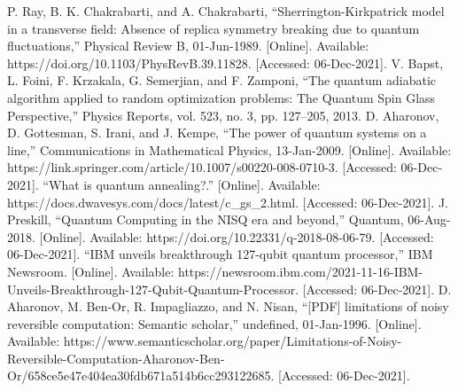\documentclass[conference]{IEEEtran}
\begin{document}
\begin{thebibliography}{00}
 P. Ray, B. K. Chakrabarti, and A. Chakrabarti, “Sherrington-Kirkpatrick model in a transverse field: Absence of replica symmetry breaking due to quantum fluctuations,” Physical Review B, 01-Jun-1989. [Online]. Available: https://doi.org/10.1103/PhysRevB.39.11828. [Accessed: 06-Dec-2021]. 
 V. Bapst, L. Foini, F. Krzakala, G. Semerjian, and F. Zamponi, “The quantum adiabatic algorithm applied to random optimization problems: The Quantum Spin Glass Perspective,” Physics Reports, vol. 523, no. 3, pp. 127–205, 2013.
 D. Aharonov, D. Gottesman, S. Irani, and J. Kempe, “The power of quantum systems on a line,” Communications in Mathematical Physics, 13-Jan-2009. [Online]. Available: https://link.springer.com/article/10.1007/s00220-008-0710-3. [Accessed: 06-Dec-2021]. 
 “What is quantum annealing?.” [Online]. Available: https://docs.dwavesys.com/docs/latest/c\_gs\_2.html. [Accessed: 06-Dec-2021]. 
 J. Preskill, “Quantum Computing in the NISQ era and beyond,” Quantum, 06-Aug-2018. [Online]. Available: https://doi.org/10.22331/q-2018-08-06-79. [Accessed: 06-Dec-2021].
 “IBM unveils breakthrough 127-qubit quantum processor,” IBM Newsroom. [Online]. Available: https://newsroom.ibm.com/2021-11-16-IBM-Unveils-Breakthrough-127-Qubit-Quantum-Processor. [Accessed: 06-Dec-2021]. 
 D. Aharonov, M. Ben-Or, R. Impagliazzo, and N. Nisan, “[PDF] limitations of noisy reversible computation: Semantic scholar,” undefined, 01-Jan-1996. [Online]. Available: https://www.semanticscholar.org/paper/Limitations-of-Noisy-Reversible-Computation-Aharonov-Ben-Or/658ce5e47e404ea30fdb671a514b6cc293122685. [Accessed: 06-Dec-2021]. 
\end{thebibliography}
\end{document}
